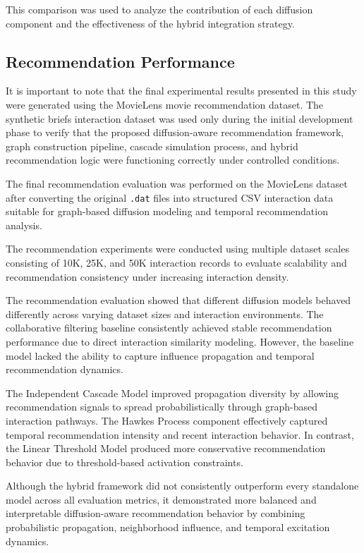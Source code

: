 \documentclass{article}
\begin{document}
This comparison was used to analyze the contribution of each diffusion component and the effectiveness of the hybrid integration strategy.

\subsection{Recommendation Performance}

It is important to note that the final experimental results presented in this study were generated using the MovieLens movie recommendation dataset. The synthetic briefs interaction dataset was used only during the initial development phase to verify that the proposed diffusion-aware recommendation framework, graph construction pipeline, cascade simulation process, and hybrid recommendation logic were functioning correctly under controlled conditions.

The final recommendation evaluation was performed on the MovieLens dataset after converting the original \texttt{.dat} files into structured CSV interaction data suitable for graph-based diffusion modeling and temporal recommendation analysis.

The recommendation experiments were conducted using multiple dataset scales consisting of 10K, 25K, and 50K interaction records to evaluate scalability and recommendation consistency under increasing interaction density.

The recommendation evaluation showed that different diffusion models behaved differently across varying dataset sizes and interaction environments. The collaborative filtering baseline consistently achieved stable recommendation performance due to direct interaction similarity modeling. However, the baseline model lacked the ability to capture influence propagation and temporal recommendation dynamics.

The Independent Cascade Model improved propagation diversity by allowing recommendation signals to spread probabilistically through graph-based interaction pathways. The Hawkes Process component effectively captured temporal recommendation intensity and recent interaction behavior. In contrast, the Linear Threshold Model produced more conservative recommendation behavior due to threshold-based activation constraints.

Although the hybrid framework did not consistently outperform every standalone model across all evaluation metrics, it demonstrated more balanced and interpretable diffusion-aware recommendation behavior by combining probabilistic propagation, neighborhood influence, and temporal excitation dynamics.
\end{document}
